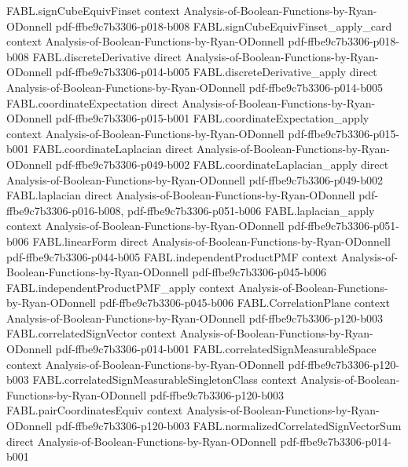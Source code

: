 \begin{theorem}
\proofstep
  {FABL.signCubeEquivFinset}
  {context}
  {Analysis-of-Boolean-Functions-by-Ryan-ODonnell}
  {pdf-ffbe9c7b3306-p018-b008}
\proofstep
  {FABL.signCubeEquivFinset_apply_card}
  {context}
  {Analysis-of-Boolean-Functions-by-Ryan-ODonnell}
  {pdf-ffbe9c7b3306-p018-b008}
\proofstep
  {FABL.discreteDerivative}
  {direct}
  {Analysis-of-Boolean-Functions-by-Ryan-ODonnell}
  {pdf-ffbe9c7b3306-p014-b005}
\proofstep
  {FABL.discreteDerivative_apply}
  {direct}
  {Analysis-of-Boolean-Functions-by-Ryan-ODonnell}
  {pdf-ffbe9c7b3306-p014-b005}
\proofstep
  {FABL.coordinateExpectation}
  {direct}
  {Analysis-of-Boolean-Functions-by-Ryan-ODonnell}
  {pdf-ffbe9c7b3306-p015-b001}
\proofstep
  {FABL.coordinateExpectation_apply}
  {context}
  {Analysis-of-Boolean-Functions-by-Ryan-ODonnell}
  {pdf-ffbe9c7b3306-p015-b001}
\proofstep
  {FABL.coordinateLaplacian}
  {direct}
  {Analysis-of-Boolean-Functions-by-Ryan-ODonnell}
  {pdf-ffbe9c7b3306-p049-b002}
\proofstep
  {FABL.coordinateLaplacian_apply}
  {direct}
  {Analysis-of-Boolean-Functions-by-Ryan-ODonnell}
  {pdf-ffbe9c7b3306-p049-b002}
\proofstep
  {FABL.laplacian}
  {direct}
  {Analysis-of-Boolean-Functions-by-Ryan-ODonnell}
  {pdf-ffbe9c7b3306-p016-b008,
    pdf-ffbe9c7b3306-p051-b006}
\proofstep
  {FABL.laplacian_apply}
  {context}
  {Analysis-of-Boolean-Functions-by-Ryan-ODonnell}
  {pdf-ffbe9c7b3306-p051-b006}
\proofstep
  {FABL.linearForm}
  {direct}
  {Analysis-of-Boolean-Functions-by-Ryan-ODonnell}
  {pdf-ffbe9c7b3306-p044-b005}
\proofstep
  {FABL.independentProductPMF}
  {context}
  {Analysis-of-Boolean-Functions-by-Ryan-ODonnell}
  {pdf-ffbe9c7b3306-p045-b006}
\proofstep
  {FABL.independentProductPMF_apply}
  {context}
  {Analysis-of-Boolean-Functions-by-Ryan-ODonnell}
  {pdf-ffbe9c7b3306-p045-b006}
\proofstep
  {FABL.CorrelationPlane}
  {context}
  {Analysis-of-Boolean-Functions-by-Ryan-ODonnell}
  {pdf-ffbe9c7b3306-p120-b003}
\proofstep
  {FABL.correlatedSignVector}
  {context}
  {Analysis-of-Boolean-Functions-by-Ryan-ODonnell}
  {pdf-ffbe9c7b3306-p014-b001}
\proofstep
  {FABL.correlatedSignMeasurableSpace}
  {context}
  {Analysis-of-Boolean-Functions-by-Ryan-ODonnell}
  {pdf-ffbe9c7b3306-p120-b003}
\proofstep
  {FABL.correlatedSignMeasurableSingletonClass}
  {context}
  {Analysis-of-Boolean-Functions-by-Ryan-ODonnell}
  {pdf-ffbe9c7b3306-p120-b003}
\proofstep
  {FABL.pairCoordinatesEquiv}
  {context}
  {Analysis-of-Boolean-Functions-by-Ryan-ODonnell}
  {pdf-ffbe9c7b3306-p120-b003}
\proofstep
  {FABL.normalizedCorrelatedSignVectorSum}
  {direct}
  {Analysis-of-Boolean-Functions-by-Ryan-ODonnell}
  {pdf-ffbe9c7b3306-p014-b001}

\end{theorem}
